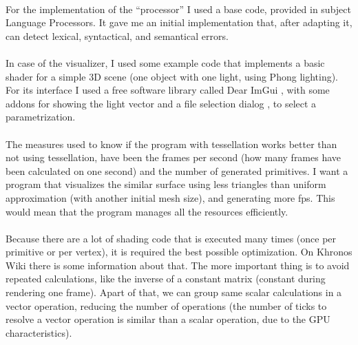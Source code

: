 \\For the implementation of the ``processor'' I used a base code, provided in subject Language Processors. It gave me an initial implementation that, after adapting it, can detect lexical, syntactical, and semantical errors.\\
\\In case of the visualizer, I used some example code that implements a basic shader for a simple $3$D scene (one object with one light, using Phong lighting). For its interface I used a free software library called Dear ImGui \cite{DearImGui}, with some addons for showing the light vector \cite{LVector} and a file selection dialog \cite{Dialog}, to select a parametrization.\\
\\The measures used to know if the program with tessellation works better than not using tessellation, have been the frames per second (how many frames have been calculated on one second) and the number of generated primitives. I want a program that visualizes the similar surface using less triangles than uniform approximation (with another initial mesh size), and generating more fps. This would mean that the program manages all the resources efficiently.\\
\\Because there are a lot of shading code that is executed many times (once per primitive or per vertex), it is required the best possible optimization. On Khronos Wiki \cite{KhronosWiki} there is some information about that. The more important thing is to avoid repeated calculations, like the inverse of a constant matrix (constant during rendering one frame). Apart of that, we can group same scalar calculations in a vector operation, reducing the number of operations (the number of ticks to resolve a vector operation is similar than a scalar operation, due to the GPU characteristics).\\

